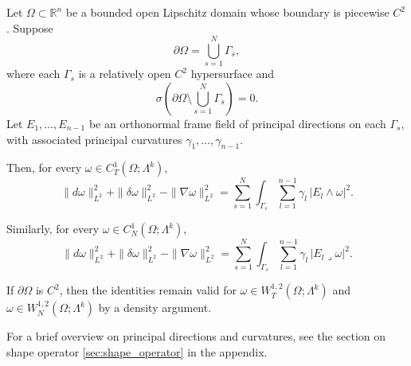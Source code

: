 \begin{theorem}
\label{thm:boundary_principal_curvature_identity}
Let $\Omega\subset\mathbb{R}^n$ be a bounded open Lipschitz domain whose boundary is piecewise $C^2$. Suppose
\[
\partial\Omega=\bigcup_{s=1}^N\Gamma_s,
\]
where each $\Gamma_s$ is a relatively open $C^2$ hypersurface and
\[\sigma\!\left(\partial\Omega\setminus\bigcup_{s=1}^N\Gamma_s\right)=0.
\]
Let $E_1,\ldots,E_{n-1}$ be an orthonormal frame field of principal directions on each $\Gamma_s$, with associated principal curvatures $\gamma_1,\ldots,\gamma_{n-1}$.

Then, for every $\omega\in C_T^1(\Omega;\Lambda^k)$,
\begin{equation}
\label{eq:tangential_boundary_identity}
\|d\omega\|_{L^2}^2+\|\delta\omega\|_{L^2}^2-\|\nabla\omega\|_{L^2}^2
=
\sum_{s=1}^N
\int_{\Gamma_s}
\sum_{l=1}^{n-1}
\gamma_l\,|E_l\wedge\omega|^2.
\end{equation}

Similarly, for every $\omega\in C_N^1(\Omega;\Lambda^k)$,
\begin{equation}
\label{eq:normal_boundary_identity}
\|d\omega\|_{L^2}^2+\|\delta\omega\|_{L^2}^2-\|\nabla\omega\|_{L^2}^2
=
\sum_{s=1}^N
\int_{\Gamma_s}
\sum_{l=1}^{n-1}
\gamma_l\,|E_l\lrcorner\omega|^2.
\end{equation}
\end{theorem}

\begin{remark}
If $\partial\Omega$ is $C^2$, then the identities remain valid for
$\omega\in W_T^{1,2}(\Omega;\Lambda^k)$ and
$\omega\in W_N^{1,2}(\Omega;\Lambda^k)$ by a density argument.
\end{remark}
\begin{remark}
    For a brief overview on principal directions and curvatures, see the section on shape operator \ref{sec:shape_operator} in the appendix.
\end{remark}

